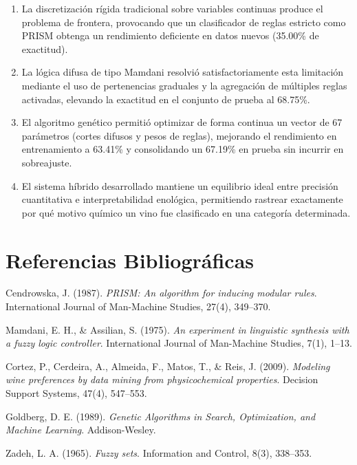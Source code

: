 \documentclass[11pt,a4paper]{article}
\begin{document}
\begin{enumerate}
    \item La discretización rígida tradicional sobre variables continuas produce el problema de frontera, provocando que un clasificador de reglas estricto como PRISM obtenga un rendimiento deficiente en datos nuevos (35.00\% de exactitud).
    \item La lógica difusa de tipo Mamdani resolvió satisfactoriamente esta limitación mediante el uso de pertenencias graduales y la agregación de múltiples reglas activadas, elevando la exactitud en el conjunto de prueba al 68.75\%.
    \item El algoritmo genético permitió optimizar de forma continua un vector de 67 parámetros (cortes difusos y pesos de reglas), mejorando el rendimiento en entrenamiento a 63.41\% y consolidando un 67.19\% en prueba sin incurrir en sobreajuste.
    \item El sistema híbrido desarrollado mantiene un equilibrio ideal entre precisión cuantitativa e interpretabilidad enológica, permitiendo rastrear exactamente por qué motivo químico un vino fue clasificado en una categoría determinada.
\end{enumerate}

\section*{Referencias Bibliográficas}
\begin{enumerate}[label={[\arabic*]}, leftmargin=1.5cm, noitemsep]
    \item Cendrowska, J. (1987). \textit{PRISM: An algorithm for inducing modular rules}. International Journal of Man-Machine Studies, 27(4), 349--370.
    \item Mamdani, E. H., \& Assilian, S. (1975). \textit{An experiment in linguistic synthesis with a fuzzy logic controller}. International Journal of Man-Machine Studies, 7(1), 1--13.
    \item Cortez, P., Cerdeira, A., Almeida, F., Matos, T., \& Reis, J. (2009). \textit{Modeling wine preferences by data mining from physicochemical properties}. Decision Support Systems, 47(4), 547--553.
    \item Goldberg, D. E. (1989). \textit{Genetic Algorithms in Search, Optimization, and Machine Learning}. Addison-Wesley.
    \item Zadeh, L. A. (1965). \textit{Fuzzy sets}. Information and Control, 8(3), 338--353.
\end{enumerate}
\end{document}
